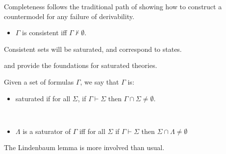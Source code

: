 \documentclass[10pt]{article}
\begin{document}
Completeness follows the traditional path of showing how to construct a countermodel for any failure of derivability.

\begin{definition}[Consistency]
  \begin{itemize}
  \item \(\Gamma\) is consistent iff \(\Gamma \nvdash \emptyset\).
  \end{itemize}
\end{definition}

Consistent sets will be saturated, and correspond to states.

\textcite{Thomason:1968aa} and \textcite{Aczel:1968aa} provide the foundations for saturated theories.

\begin{definition}[Saturation]
  Given a set of formulas \(\Gamma\), we say that \(\Gamma\) is:
  \begin{itemize}
  \item saturated if for all \(\Sigma\), if \(\Gamma \vdash \Sigma\) then \(\Gamma \cap \Sigma \ne \emptyset\).
  \end{itemize}
\end{definition}

\begin{definition}[Saturators]
  \mbox{ }
  \begin{itemize}
  \item \(\Lambda\) is a saturator of \(\Gamma\) iff for all \(\Sigma\) if \(\Gamma \vdash \Sigma\) then \(\Sigma \cap \Lambda \ne \emptyset\)
  \end{itemize}
\end{definition}


The Lindenbaum lemma is more involved than usual.
\end{document}
